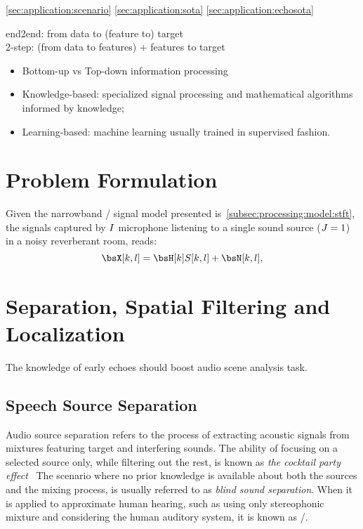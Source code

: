 \cref{sec:application:scenario}
\cref{sec:application:sota}
\cref{sec:application:echosota}


end2end: from data to (feature to) target
\\2-step: (from data to features) + features to target

\begin{itemize}
    \item Bottom-up vs Top-down information processing
    \item Knowledge-based: specialized signal processing and mathematical algorithms informed by knowledge;
    \item Learning-based: machine learning usually trained in supervised fashion.
\end{itemize}



\section{Problem Formulation}
Given the narrowband \STFT/ signal model presented is~\cref{subsec:processing:model:stft}, the signals captured by $I$ microphone listening to a single sound source ($J=1$) in a noisy reverberant room, reads:
\begin{equation}
    \MICS[k,l] = \FLTS[k] \SRC[k, l]+ \NSES[k,l]
    ,
\end{equation}








\section{Separation, Spatial Filtering and Localization}
The knowledge of early echoes should boost audio scene analysis task.

\subsection{Speech Source Separation}
Audio source separation refers to the process of extracting acoustic signals from mixtures featuring target and interfering sounds.
The ability of focusing on a selected source only, while filtering out the rest, is known as \textit{the cocktail party effect}~
The scenario where no prior knowledge is available about both the sources and the mixing process, is usually referred to as \textit{blind sound separation}.
When it is applied to approximate human hearing, such as using only stereophonic mixture and considering the human auditory system, it is known as \CASAdef/.

